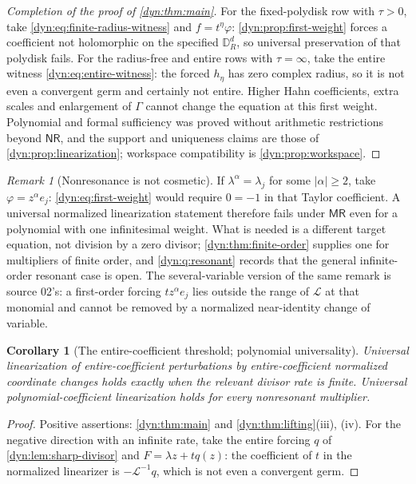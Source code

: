 \documentclass[11pt,letterpaper]{article}
\newtheorem{corollary}[corollary]{Corollary}
\theoremstyle{definition}
\theoremstyle{remark}
\newtheorem{remark}[remark]{Remark}
\newcommand{\Li}{\mathcal L}
\newcommand{\mres}{\mathsf{MR}}
\newcommand{\nres}{\mathsf{NR}}
\numberwithin{equation}{section}
\begin{document}
\begin{proof}[Completion of the proof of \cref{dyn:thm:main}]
For the fixed-polydisk row with $\tau>0$, take
\eqref{dyn:eq:finite-radius-witness} and $f=t^{\eta}\varphi$:
\cref{dyn:prop:first-weight} forces a coefficient not holomorphic on the
specified $\mathbb D_R^{d}$, so universal preservation of that polydisk
fails. For the radius-free and entire rows with $\tau=\infty$, take the
entire witness \eqref{dyn:eq:entire-witness}: the forced $h_\eta$ has zero
complex radius, so it is not even a convergent germ and certainly not
entire. Higher Hahn coefficients, extra scales and enlargement of $\Gamma$
cannot change the equation at this first weight. Polynomial and formal
sufficiency was proved without arithmetic restrictions beyond $\nres$, and
the support and uniqueness claims are those of
\cref{dyn:prop:linearization}; workspace compatibility is
\cref{dyn:prop:workspace}.
\end{proof}

\begin{remark}[Nonresonance is not cosmetic]\label{dyn:rem:nres}
If $\lambda^{\alpha}=\lambda_j$ for some $|\alpha|\ge2$, take
$\varphi=z^{\alpha}e_j$: \eqref{dyn:eq:first-weight} would require $0=-1$
in that Taylor coefficient. A universal normalized linearization statement
therefore fails under $\mres$ even for a polynomial with one infinitesimal
weight. What is needed is a different target equation, not division by a
zero divisor; \cref{dyn:thm:finite-order} supplies one for multipliers of
finite order, and \cref{dyn:q:resonant} records that the general
infinite-order resonant case is open. The several-variable version of the
same remark is source 02's: a first-order forcing $tz^{\alpha}e_j$ lies
outside the range of $\Li$ at that monomial and cannot be removed by a
normalized near-identity change of variable.
\end{remark}

\begin{corollary}[The entire-coefficient threshold; polynomial universality]
\label{dyn:cor:entirethreshold}
Universal linearization of entire-coefficient perturbations by
entire-coefficient normalized coordinate changes holds exactly when the
relevant divisor rate is finite. Universal polynomial-coefficient
linearization holds for \emph{every} nonresonant multiplier.
\end{corollary}
\begin{proof}
Positive assertions: \cref{dyn:thm:main} and \cref{dyn:thm:lifting}(iii),
(iv). For the negative direction with an infinite rate, take the entire
forcing $q$ of \cref{dyn:lem:sharp-divisor} and $F=\lambda z+tq(z)$: the
coefficient of $t$ in the normalized linearizer is $-\Li^{-1}q$, which is
not even a convergent germ.
\end{proof}
\end{document}
